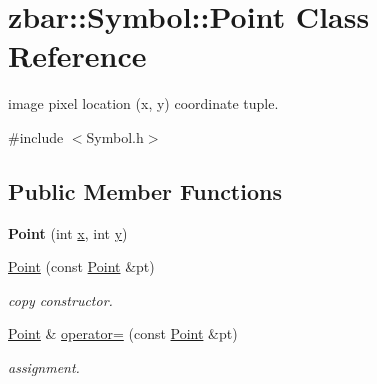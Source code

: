 \hypertarget{classzbar_1_1_symbol_1_1_point}{
\section{zbar::Symbol::Point Class Reference}
\label{classzbar_1_1_symbol_1_1_point}
}


image pixel location (x, y) coordinate tuple.  




{\ttfamily \#include $<$Symbol.h$>$}

\subsection*{Public Member Functions}
\begin{DoxyCompactItemize}
\item 
\hypertarget{classzbar_1_1_symbol_1_1_point_a02ecf9ba60f5671da74020e4eef79d97}{
{\bfseries Point} (int \hyperlink{classzbar_1_1_symbol_1_1_point_a742bee232fd98ad427b9da3dc7e583f8}{x}, int \hyperlink{classzbar_1_1_symbol_1_1_point_a00460abb9489bcd72fefa301806680a2}{y})}
\label{classzbar_1_1_symbol_1_1_point_a02ecf9ba60f5671da74020e4eef79d97}

\item 
\hypertarget{classzbar_1_1_symbol_1_1_point_ab74f2b383e35c292e838ba935e116d7a}{
\hyperlink{classzbar_1_1_symbol_1_1_point_ab74f2b383e35c292e838ba935e116d7a}{Point} (const \hyperlink{classzbar_1_1_symbol_1_1_point}{Point} \&pt)}
\label{classzbar_1_1_symbol_1_1_point_ab74f2b383e35c292e838ba935e116d7a}

\begin{DoxyCompactList}\small\item\em copy constructor. \end{DoxyCompactList}\item 
\hypertarget{classzbar_1_1_symbol_1_1_point_abbdf94b5f77e515469b0d23e48aa6978}{
\hyperlink{classzbar_1_1_symbol_1_1_point}{Point} \& \hyperlink{classzbar_1_1_symbol_1_1_point_abbdf94b5f77e515469b0d23e48aa6978}{operator=} (const \hyperlink{classzbar_1_1_symbol_1_1_point}{Point} \&pt)}
\label{classzbar_1_1_symbol_1_1_point_abbdf94b5f77e515469b0d23e48aa6978}

\begin{DoxyCompactList}\small\item\em assignment. \end{DoxyCompactList}\end{DoxyCompactItemize}
